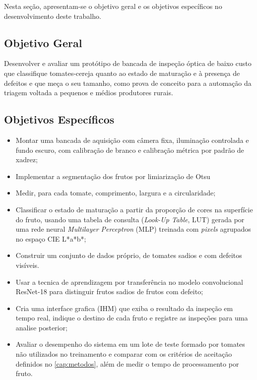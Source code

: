Nesta seção, apresentam-se o objetivo geral e os objetivos específicos no desenvolvimento deste trabalho.

\subsection{Objetivo Geral}

Desenvolver e avaliar um protótipo de bancada de inspeção óptica de baixo custo que classifique tomates-cereja quanto ao estado de maturação e à presença de defeitos e que meça o seu tamanho, como prova de conceito para a automação da triagem voltada a pequenos e médios produtores rurais.

\subsection{Objetivos Específicos}

\begin{itemize}
	\item Montar uma bancada de aquisição com câmera fixa, iluminação controlada e fundo escuro, com calibração de branco e calibração métrica por padrão de xadrez;
	\item Implementar a segmentação dos frutos por limiarização de Otsu
	\item Medir, para cada tomate, comprimento, largura e a circularidade;
	\item Classificar o estado de maturação a partir da proporção de cores na superfície do fruto, usando uma tabela de consulta (\textit{Look-Up Table}, LUT) gerada por uma rede neural \textit{Multilayer Perceptron} (MLP) treinada com \textit{pixels} agrupados no espaço CIE L*a*b*;
	\item Construir um conjunto de dados próprio, de tomates sadios e com defeitos visíveis.
	\item Usar a tecnica de aprendizagem por transferência no modelo convolucional ResNet-18 para distinguir frutos sadios de frutos com defeito;
	\item Cria uma interface grafica (IHM) que exiba o resultado da inspeção em tempo real, indique o destino de cada fruto e registre as inspeções para uma analise posterior;
	\item Avaliar o desempenho do sistema em um lote de teste formado por tomates não utilizados no treinamento e comparar com os critérios de aceitação definidos no \autoref{cap:metodos}, além de medir o tempo de processamento por fruto.
\end{itemize}

